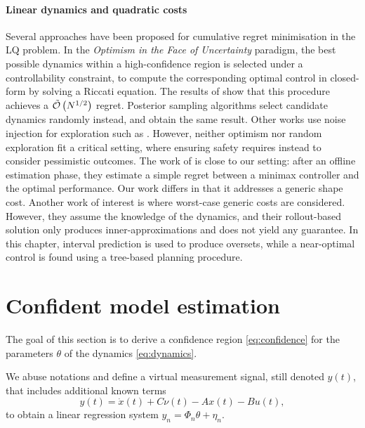 \paragraph{Linear dynamics and quadratic costs} Several approaches have been proposed for cumulative regret minimisation in the LQ problem. In the \emph{Optimism in the Face of Uncertainty} paradigm, the best possible dynamics within a high-confidence region is selected under a controllability constraint, to compute the corresponding optimal control in closed-form by solving a Riccati equation. The results of 	\citep{abbasi-yadkori11a,Ibrahimi2013,Faradonbeh2017} show that this procedure achieves a $\tilde{\mathcal{O}}\left(N^{1/2}\right)$ regret. Posterior sampling algorithms \citep{Ouyang2017,abeille18a} select candidate dynamics randomly instead, and obtain the same result. Other works use noise injection for exploration such as \citep{Dean2017,Dean2018}. However, neither optimism nor random exploration fit a critical setting, where ensuring safety requires instead to consider pessimistic outcomes. The work of \citet{Dean2017} is close to our setting: after an offline estimation phase, they estimate a simple regret between a minimax controller and the optimal performance. Our work differs in that it addresses a generic shape cost. 
Another work of interest is \citep{Rosolia2019} where worst-case generic costs are considered. However, they assume the knowledge of the dynamics, and their rollout-based solution only produces inner-approximations and does not yield any guarantee. In this chapter, interval prediction is used to produce oversets, while a near-optimal control is found using a tree-based planning procedure.


\section{Confident model estimation}
\label{sec:estimation}

The goal of this section is to derive a confidence region \eqref{eq:confidence} for the parameters $\theta$ of the dynamics \eqref{eq:dynamics}.


We abuse notations and define a virtual measurement signal, still denoted $y(t)$, that includes additional known terms
\begin{equation*}
y(t) = \dot{x}(t) + C\nu(t) - A x(t) - Bu(t),
\end{equation*}
to obtain a linear regression system
$
y_n = \Phi_n\theta + \eta_n.
$

